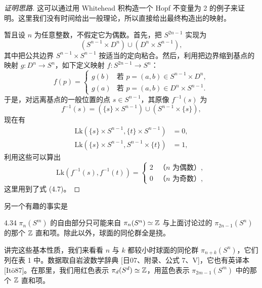 \begin{proof}[证明思路]
这可以通过用 Whitehead 积构造一个 Hopf 不变量为 2 的例子来证明。这里我们没有时间给出一般理论，所以直接给出最终构造出的映射。

暂且设 $n$ 为任意整数，不假定它为偶数。首先，把 $S^{2n-1}$ 实现为
\begin{equation}
(S^{n-1}\times D^n)\cup(D^n\times S^{n-1}),
\tag{4.8}
\end{equation}
其中把公共边界 $S^{n-1}\times S^{n-1}$ 按适当的定向粘合。然后，利用把边界缩到基点的映射 $g:D^n\to S^n$，如下定义映射 $f:S^{2n-1}\to S^n$：
\begin{equation}
f(p)=
\begin{cases}
g(b) & \text{若 } p=(a,b)\in S^{n-1}\times D^n,\\
g(a) & \text{若 } p=(a,b)\in D^n\times S^{n-1}.
\end{cases}
\tag{4.9}
\end{equation}
于是，对远离基点的一般位置的点 $s\in S^{n-1}$，其原像 $f^{-1}(s)$ 为
\begin{equation}
f^{-1}(s)=(\{s\}\times S^{n-1})\cup(S^{n-1}\times\{s\}),
\tag{4.10}
\end{equation}
现在有
\begin{align}
\mathrm{Lk}(\{s\}\times S^{n-1},\{t\}\times S^{n-1})&=0,\tag{4.11}\\
\mathrm{Lk}(\{s\}\times S^{n-1},S^{n-1}\times\{t\})&=1,\tag{4.12}
\end{align}
利用这些可以算出
\begin{equation}
\mathrm{Lk}(f^{-1}(s),f^{-1}(t))=
\begin{cases}
2 & \text{（$n$ 为偶数）},\\
0 & \text{（$n$ 为奇数）},
\end{cases}
\tag{4.13}
\end{equation}
这里用到了式 (4.7)。
\end{proof}

另一个有趣的事实是

\begin{theorem}{4.34}
$\pi_n(S^m)$ 的自由部分只可能来自 $\pi_n(S^n)\simeq\mathbb{Z}$ 与上面讨论过的 $\pi_{2n-1}(S^n)$ 的那个 $\mathbb{Z}$ 直和项。除此以外，球面的同伦群全是挠。
\end{theorem}

讲完这些基本性质，我们来看看 $n$ 与 $k$ 都较小时球面的同伦群 $\pi_{n+k}(S^n)$，它们列在表 1 中。数据取自岩波数学辞典 [日07、附录、公式 7、V]，它也有英译本 [Itö87]。在那里，我们用红色表示 $\pi_d(S^d)\simeq\mathbb{Z}$，用蓝色表示 $\pi_{2m-1}(S^m)$ 中的那个 $\mathbb{Z}$ 直和项。

